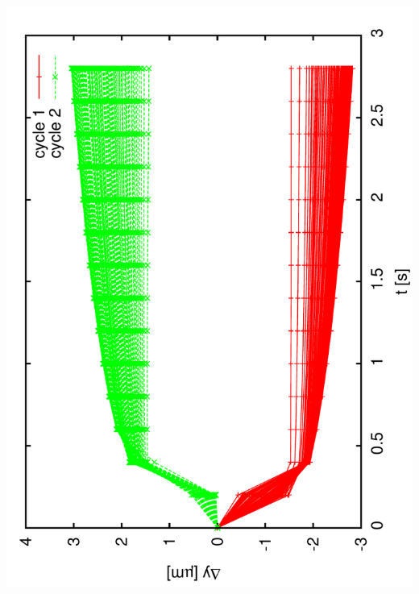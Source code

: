 \documentclass[a4paper,11pt]{book}
\begin{document}
 \includegraphics[angle=-90,scale=0.16]{image14.pdf}\\
\end{document}
